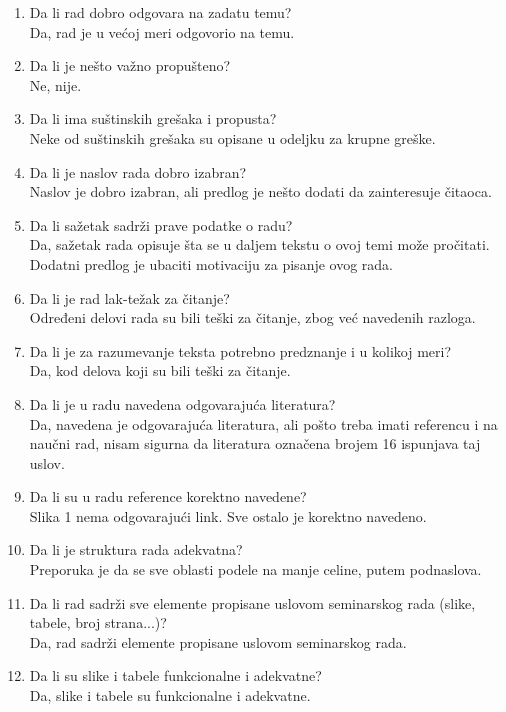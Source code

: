 \documentclass[a4paper]{report}
\begin{document}
\begin{enumerate}
\item Da li rad dobro odgovara na zadatu temu?\\
Da, rad je u većoj meri odgovorio na temu.
\item Da li je nešto važno propušteno?\\
Ne, nije.
\item Da li ima suštinskih grešaka i propusta?\\
Neke od suštinskih grešaka su opisane u odeljku za krupne greške.
\item Da li je naslov rada dobro izabran?\\
Naslov je dobro izabran, ali predlog je nešto dodati da zainteresuje čitaoca.
\item Da li sažetak sadrži prave podatke o radu?\\
Da, sažetak rada opisuje šta se u daljem tekstu o ovoj temi može pročitati. Dodatni predlog je ubaciti motivaciju za pisanje ovog rada.
\item Da li je rad lak-težak za čitanje?\\
Određeni delovi rada su bili teški za čitanje, zbog već navedenih razloga.
\item Da li je za razumevanje teksta potrebno predznanje i u kolikoj meri?\\
Da, kod delova koji su bili teški za čitanje.
\item Da li je u radu navedena odgovarajuća literatura?\\
Da, navedena je odgovarajuća literatura, ali pošto treba imati referencu i na naučni rad, nisam sigurna da literatura označena brojem 16 ispunjava taj uslov.
\item Da li su u radu reference korektno navedene?\\
Slika 1 nema odgovarajući link. Sve ostalo je korektno navedeno.
\item Da li je struktura rada adekvatna?\\
Preporuka je da se sve oblasti podele na manje celine, putem podnaslova.
\item Da li rad sadrži sve elemente propisane uslovom seminarskog rada (slike, tabele, broj strana...)?\\Da, rad sadrži elemente propisane uslovom seminarskog rada.
\item Da li su slike i tabele funkcionalne i adekvatne?\\
Da, slike i tabele su funkcionalne i adekvatne.
\end{enumerate}
\end{document}
